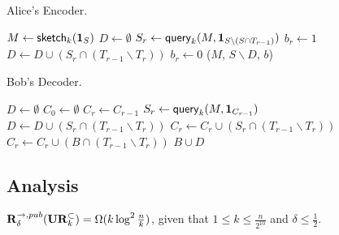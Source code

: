 \begin{algorithm}[H] 
  \caption{Alice's Encoder.} \label{algo:enc4}
  \begin{algorithmic}[1]
    \State $M \leftarrow \mathsf{sketch}_k(\mathbf{1}_S)$
    \State $D\leftarrow \emptyset$
    \State $S_r\leftarrow \mathsf{query}_k(M, \mathbf{1}_{S\backslash (S\cap T_{r-1})})$
     
      \State $b_r\leftarrow 1$ 
      \State $D\leftarrow D \cup (S_r\cap (T_{r-1}\backslash T_r))$
    \Else 
      \State $b_r\leftarrow 0$
    \EndIf
    \EndFor
      \State \Return ($M$, $S\backslash D$, $b$) 
    \EndProcedure
  \end{algorithmic}
\end{algorithm}

\begin{algorithm}[H] 
  \caption{Bob's Decoder.} \label{algo:dec4}
  \begin{algorithmic}[1]
    \State $D\leftarrow \emptyset$
    \State $C_0 \leftarrow \emptyset$
      \State $C_r\leftarrow C_{r-1}$
        \State $S_r\leftarrow \mathsf{query}_k(M, \mathbf{1}_{C_{r-1}})$ 
        \State $D\leftarrow D \cup (S_r\cap (T_{r-1}\backslash T_r))$
        \State $C_r\leftarrow C_r \cup (S_r\cap (T_{r-1}\backslash T_r))$
      \EndIf
      \State $C_r\leftarrow C_r \cup (B\cap (T_{r-1}\backslash T_r))$
    \EndFor
    \State \Return $B\cup D$ 
    \EndProcedure
  \end{algorithmic}
\end{algorithm}

\subsection{Analysis}

\begin{theorem}
  $\mathbf{R}^{\rightarrow,pub}_\delta(\mathbf{UR}_k^\subset) = \Omega(k\log^2 \frac{n}{k} )$, given that $1 \le k \le \frac{n}{2^{10}}$ and $\delta \le \frac{1}{2}$.
\end{theorem}

